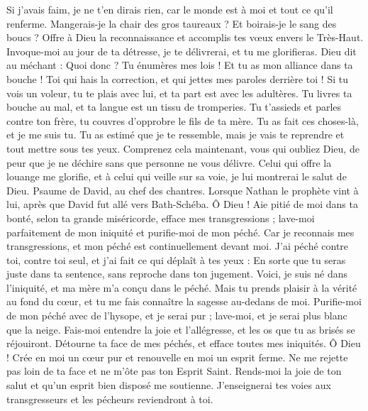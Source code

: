 \begin{multicols}{2}
Si j'avais faim, je ne t'en dirais rien, car le monde est à moi et tout ce qu'il renferme.
Mangerais-je la chair des gros taureaux ? Et boirais-je le sang des boucs ?
Offre à Dieu la reconnaissance et accomplis tes vœux envers le Très-Haut.
Invoque-moi au jour de ta détresse, je te délivrerai, et tu me glorifieras.
Dieu dit au méchant : Quoi donc ? Tu énumères mes lois ! Et tu as mon alliance dans ta bouche !
Toi qui hais la correction, et qui jettes mes paroles derrière toi !
Si tu vois un voleur, tu te plais avec lui, et ta part est avec les adultères.
Tu livres ta bouche au mal, et ta langue est un tissu de tromperies.
Tu t'assieds et parles contre ton frère, tu couvres d'opprobre le fils de ta mère.
Tu as fait ces choses-là, et je me suis tu. Tu as estimé que je te ressemble, mais je vais te reprendre et tout mettre sous tes yeux.
Comprenez cela maintenant, vous qui oubliez Dieu, de peur que je ne déchire sans que personne ne vous délivre.
Celui qui offre la louange me glorifie, et à celui qui veille sur sa voie, je lui montrerai le salut de Dieu.
\VerseOne{}Psaume de David, au chef des chantres.
Lorsque Nathan le prophète vint à lui, après que David fut allé vers Bath-Schéba.
Ô Dieu ! Aie pitié de moi dans ta bonté, selon ta grande miséricorde, efface mes transgressions ;
lave-moi parfaitement de mon iniquité et purifie-moi de mon péché.
Car je reconnais mes transgressions, et mon péché est continuellement devant moi.
J'ai péché contre toi, contre toi seul, et j'ai fait ce qui déplaît à tes yeux : En sorte que tu seras juste dans ta sentence, sans reproche dans ton jugement.
Voici, je suis né dans l'iniquité, et ma mère m'a conçu dans le péché.
Mais tu prends plaisir à la vérité au fond du cœur, et tu me fais connaître la sagesse au-dedans de moi.
Purifie-moi de mon péché avec de l'hysope, et je serai pur ; lave-moi, et je serai plus blanc que la neige.
Fais-moi entendre la joie et l'allégresse, et les os que tu as brisés se réjouiront.
Détourne ta face de mes péchés, et efface toutes mes iniquités.
Ô Dieu ! Crée en moi un cœur pur et renouvelle en moi un esprit ferme.
Ne me rejette pas loin de ta face et ne m'ôte pas ton Esprit Saint.
Rends-moi la joie de ton salut et qu'un esprit bien disposé me soutienne.
J'enseignerai tes voies aux transgresseurs et les pécheurs reviendront à toi.

\end{multicols}

